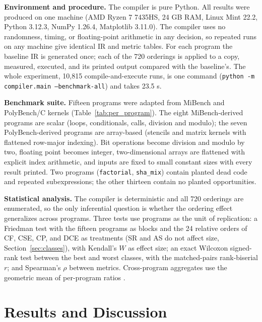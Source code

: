 \documentclass[conference]{IEEEtran}
\begin{document}
\textbf{Environment and procedure.} The compiler is pure Python. All results were produced on one machine (AMD Ryzen 7 7435HS, 24 GB RAM, Linux Mint 22.2, Python 3.12.3, NumPy 1.26.4, Matplotlib 3.11.0). The compiler uses no randomness, timing, or floating-point arithmetic in any decision, so repeated runs on any machine give identical IR and metric tables. For each program the baseline IR is generated once; each of the 720 orderings is applied to a copy, measured, executed, and its printed output compared with the baseline's. The whole experiment, 10,815 compile-and-execute runs, is one command (\texttt{python -m compiler.main --benchmark-all}) and takes 23.5 s.

\textbf{Benchmark suite.} Fifteen programs were adapted from MiBench \cite{ref32} and PolyBench/C \cite{ref31} kernels (Table~\ref{tab:per_program}). The eight MiBench-derived programs are scalar (loops, conditionals, calls, division and modulo); the seven PolyBench-derived programs are array-based (stencils and matrix kernels with flattened row-major indexing). Bit operations become division and modulo by two, floating point becomes integer, two-dimensional arrays are flattened with explicit index arithmetic, and inputs are fixed to small constant sizes with every result printed. Two programs (\texttt{factorial}, \texttt{sha\_mix}) contain planted dead code and repeated subexpressions; the other thirteen contain no planted opportunities.

\textbf{Statistical analysis.} The compiler is deterministic and all 720 orderings are enumerated, so the only inferential question is whether the ordering effect generalizes across programs. Three tests use programs as the unit of replication: a Friedman test with the fifteen programs as blocks and the 24 relative orders of CF, CSE, CP, and DCE as treatments (SR and AS do not affect size, Section~\ref{sec:classes}), with Kendall's $W$ as effect size; an exact Wilcoxon signed-rank test between the best and worst classes, with the matched-pairs rank-biserial $r$; and Spearman's $\rho$ between metrics. Cross-program aggregates use the geometric mean of per-program ratios \cite{ref33}.

\section{Results and Discussion}
\end{document}
